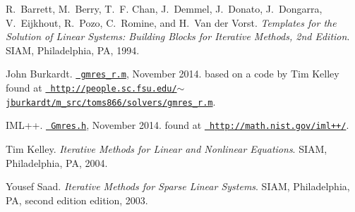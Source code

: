 
\begin{DoxyDescription}
\item[\label{citelist_CITEREF_templates}%
\Hypertarget{citelist_CITEREF_templates}%
\mbox{[}1\mbox{]}]R.~Barrett, M.~Berry, T.~F. Chan, J.~Demmel, J.~Donato, J.~Dongarra, V.~Eijkhout, R.~Pozo, C.~Romine, and H.~Van der Vorst. {\itshape Templates for the Solution of Linear Systems\+: Building Blocks for Iterative Methods, 2nd Edition}. SIAM, Philadelphia, PA, 1994.


\item[\label{citelist_CITEREF_BurkardtCode}%
\Hypertarget{citelist_CITEREF_BurkardtCode}%
\mbox{[}2\mbox{]}]John Burkardt. \href{http://people.sc.fsu.edu/~jburkardt/m_src/toms866/solvers/gmres_r.m}{\texttt{ gmres\+\_\+r.\+m}}, November 2014. based on a code by Tim Kelley found at \href{http://people.sc.fsu.edu/~jburkardt/m_src/toms866/solvers/gmres_r.m}{\texttt{ http\+://people.\+sc.\+fsu.\+edu/$\sim$jburkardt/m\+\_\+src/toms866/solvers/gmres\+\_\+r.\+m}}.


\item[\label{citelist_CITEREF_imlCode}%
\Hypertarget{citelist_CITEREF_imlCode}%
\mbox{[}3\mbox{]}]IML++. \href{http://math.nist.gov/iml++/}{\texttt{ Gmres.\+h}}, November 2014. found at \href{http://math.nist.gov/iml++/}{\texttt{ http\+://math.\+nist.\+gov/iml++/}}.


\item[\label{citelist_CITEREF_iterativeMethods}%
\Hypertarget{citelist_CITEREF_iterativeMethods}%
\mbox{[}4\mbox{]}]Tim Kelley. {\itshape Iterative Methods for Linear and Nonlinear Equations}. SIAM, Philadelphia, PA, 2004.


\item[\label{citelist_CITEREF_sparseIterative}%
\Hypertarget{citelist_CITEREF_sparseIterative}%
\mbox{[}5\mbox{]}]Yousef Saad. {\itshape Iterative Methods for Sparse Linear Systems}. SIAM, Philadelphia, PA, second edition edition, 2003.


\end{DoxyDescription}